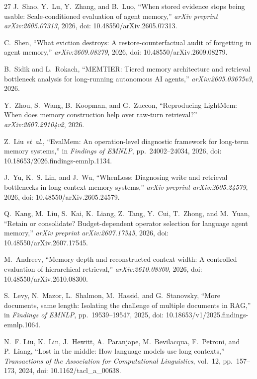 \begin{thebibliography}{27}
J.~Shao, Y.~Lu, Y.~Zhang, and B.~Luo, ``When stored evidence stops being usable: Scale-conditioned evaluation of agent memory,'' \emph{arXiv preprint arXiv:2605.07313}, 2026, doi: 10.48550/arXiv.2605.07313.

C.~Shen, ``What eviction destroys: A restore-counterfactual audit of forgetting in agent memory,'' \emph{arXiv:2609.08279}, 2026, doi: 10.48550/arXiv.2609.08279.

B.~Sidik and L.~Rokach, ``MEMTIER: Tiered memory architecture and retrieval bottleneck analysis for long-running autonomous AI agents,'' \emph{arXiv:2605.03675v3}, 2026.

Y.~Zhou, S.~Wang, B.~Koopman, and G.~Zuccon, ``Reproducing LightMem: When does memory construction help over raw-turn retrieval?'' \emph{arXiv:2607.29104v2}, 2026.

Z.~Liu \emph{et~al.}, ``EvalMem: An operation-level diagnostic framework for long-term memory systems,'' in \emph{Findings of EMNLP}, pp.~24002--24034, 2026, doi: 10.18653/2026.findings-emnlp.1134.

J.~Yu, K.~S. Lin, and J.~Wu, ``WhenLoss: Diagnosing write and retrieval bottlenecks in long-context memory systems,'' \emph{arXiv preprint arXiv:2605.24579}, 2026, doi: 10.48550/arXiv.2605.24579.

Q.~Kang, M.~Liu, S.~Kai, K.~Liang, Z.~Tang, Y.~Cui, T.~Zhong, and M.~Yuan, ``Retain or consolidate? Budget-dependent operator selection for language agent memory,'' \emph{arXiv preprint arXiv:2607.17545}, 2026, doi: 10.48550/arXiv.2607.17545.

M.~Andreev, ``Memory depth and reconstructed context width: A controlled evaluation of hierarchical retrieval,'' \emph{arXiv:2610.08300}, 2026, doi: 10.48550/arXiv.2610.08300.

S.~Levy, N.~Mazor, L.~Shalmon, M.~Hassid, and G.~Stanovsky, ``More documents, same length: Isolating the challenge of multiple documents in RAG,'' in \emph{Findings of EMNLP}, pp.~19539--19547, 2025, doi: 10.18653/v1/2025.findings-emnlp.1064.

N.~F. Liu, K.~Lin, J.~Hewitt, A.~Paranjape, M.~Bevilacqua, F.~Petroni, and P.~Liang, ``Lost in the middle: How language models use long contexts,'' \emph{Transactions of the Association for Computational Linguistics}, vol.~12, pp.~157--173, 2024, doi: 10.1162/tacl\_a\_00638.


\end{thebibliography}
